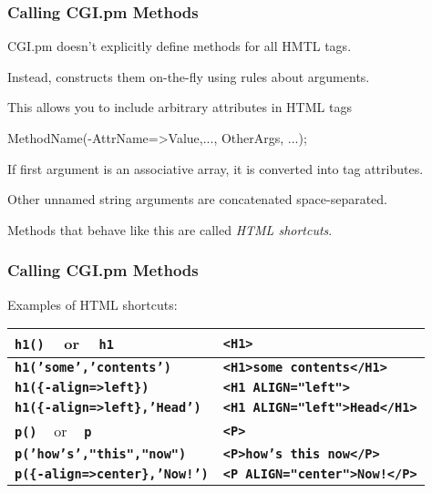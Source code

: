 \begin{frame}[fragile]
\frametitle{Calling CGI.pm Methods}
CGI.pm doesn't explicitly define methods for all HMTL tags.

Instead, constructs them on-the-fly using rules about arguments.

This allows you to include arbitrary attributes in HTML tags
\begin{perl}
    MethodName(-AttrName=>Value,..., OtherArgs, ...);
\end{perl}

If first argument is an associative array, it is converted into tag attributes.

Other unnamed string arguments are concatenated space-separated.

Methods that behave like this are called {\em HTML shortcuts}.
\end{frame}

\begin{frame}
\frametitle{Calling CGI.pm Methods}
Examples of HTML shortcuts:

\begin{center}
\begin{tabular}{|l|l|}
\hline
\textbf{\tt{h1()}} ~ or ~ \textbf{\tt{h1}}
&
\textbf{\tt{{\textless}H1>}}
\\ \hline
\textbf{\tt{h1('some','contents')}}
&
\textbf{\tt{{\textless}H1>some contents{\textless}/H1>}}
\\ \hline
\textbf{\tt{h1(\{-align=>left\})}}
&
\textbf{\tt{{\textless}H1 ALIGN="left">}}
\\ \hline
\textbf{\tt{h1(\{-align=>left\},'Head')}}
&
\textbf{\tt{{\textless}H1 ALIGN="left">Head{\textless}/H1>}}
\\ \hline
\textbf{\tt{p()}} ~ or ~ \textbf{\tt{p}}
&
\textbf{\tt{{\textless}P>}}
\\ \hline
\textbf{\tt{p('how's',"this","now")}}
&
\textbf{\tt{{\textless}P>how's this now{\textless}/P>}}
\\ \hline
\textbf{\tt{p(\{-align=>center\},'Now!')}} & \textbf{\tt{{\textless}P ALIGN="center">Now!{\textless}/P>}} \\ \hline\hline
\end{tabular}
\end{center}

\end{frame}

